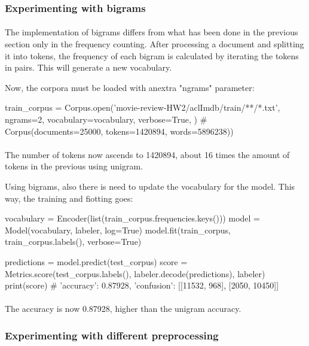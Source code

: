\documentclass{article}
\begin{document}
\subsubsection*{Experimenting with bigrams}

\paragraph{} The implementation of bigrams differs from what has been done in the previous section only in the frequency counting. After processing a document and splitting it into tokens, the frequency of each bigram is calculated by iterating the tokens in pairs. This will generate a new vocabulary.

Now, the corpora must be loaded with anextra "ngrams" parameter:

\begin{python}
train_corpus = Corpus.open('movie-review-HW2/aclImdb/train/**/*.txt',
    ngrams=2,
    vocabulary=vocabulary,
    verbose=True,
)
# Corpus(documents=25000, tokens=1420894, words=5896238))
\end{python}

\paragraph{} The number of tokens now ascends to 1420894, about 16 times the amount of tokens in the previous using unigram.

Using bigrams, also there is need to update the vocabulary for the model. This way, the training and fiotting goes:

\begin{python}
vocabulary = Encoder(list(train_corpus.frequencies.keys()))
model = Model(vocabulary, labeler, log=True)
model.fit(train_corpus, train_corpus.labels(), verbose=True)

predictions = model.predict(test_corpus)
score = Metrics.score(test_corpus.labels(), labeler.decode(predictions), labeler)
print(score)
# {'accuracy': 0.87928, 'confusion': [[11532, 968], [2050, 10450]]}
\end{python}

\paragraph{} The accuracy is now 0.87928, higher than the unigram accuracy.

\subsubsection*{Experimenting with different preprocessing}
\end{document}
